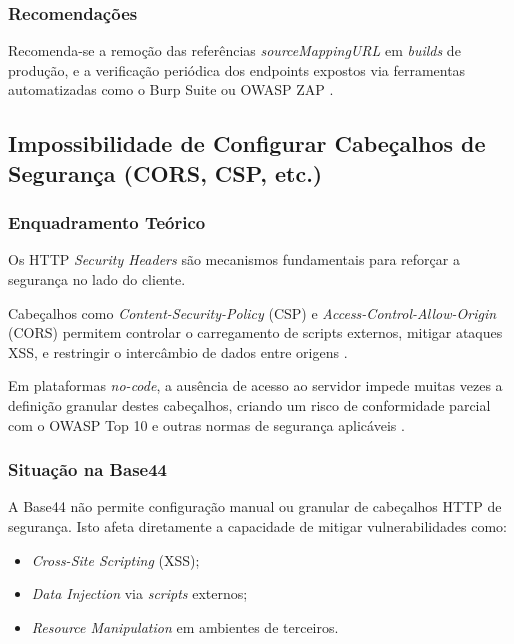 \subsubsection{Recomendações}

Recomenda-se a remoção das referências \textit{sourceMappingURL} em \textit{builds} de produção, e a verificação periódica dos endpoints expostos via ferramentas automatizadas como o Burp Suite ou OWASP ZAP \cite{ref23}.

\subsection{Impossibilidade de Configurar Cabeçalhos de Segurança (CORS, CSP, etc.)}

\subsubsection{Enquadramento Teórico}

Os HTTP \textit{Security Headers} são mecanismos fundamentais para reforçar a segurança no lado do cliente.

Cabeçalhos como \textit{Content-Security-Policy} (CSP) e \textit{Access-Control-Allow-Origin} (CORS) permitem controlar o carregamento de scripts externos, mitigar ataques XSS, e restringir o intercâmbio de dados entre origens \cite{ref19, ref24}.

Em plataformas \textit{no-code}, a ausência de acesso ao servidor impede muitas vezes a definição granular destes cabeçalhos, criando um risco de conformidade parcial com o OWASP Top 10 e outras normas de segurança aplicáveis \cite{ref25}.

\subsubsection{Situação na Base44}

A Base44 não permite configuração manual ou granular de cabeçalhos HTTP de segurança. Isto afeta diretamente a capacidade de mitigar vulnerabilidades como:

\begin{itemize}

\item \textit{Cross-Site Scripting} (XSS);

\item \textit{Data Injection} via \textit{scripts} externos;

\item \textit{Resource Manipulation} em ambientes de terceiros.

\end{itemize}

